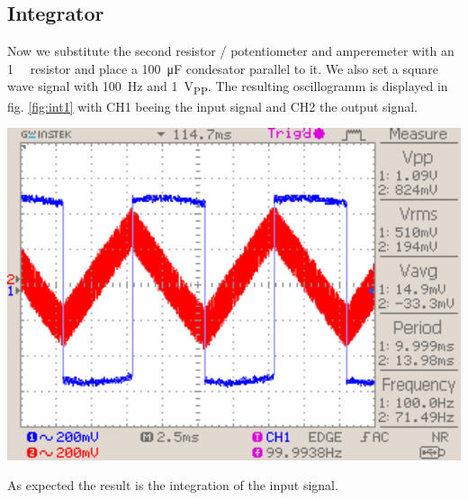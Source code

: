 \documentclass[a4paper,10pt]{article}
\newenvironment{Figure}
        {\par\medskip\noindent\minipage{\linewidth}}
        {\endminipage\par\medskip}
\numberwithin{equation}{section}
\begin{document}
\begin{multicols}{2}
	\subsection{Integrator}
	Now we substitute the second resistor / potentiometer and amperemeter with an \SI{1}{\mega \Omega} resistor and place a \SI{100}{\micro F} condesator parallel to it. We also set a square wave signal with \SI{100}{Hz} and \SI{1}{V_{PP}}. The resulting oscillogramm is displayed in fig. \ref{fig:int1} with CH1 beeing the input signal and CH2 the output signal.
	\begin{Figure}
		\centering
		\includegraphics[width=1\textwidth]{../data/DS0032_n.png}
		\label{fig:int1}
	\end{Figure}
	As expected the result is the integration of the input signal.


\end{multicols}
\end{document}
